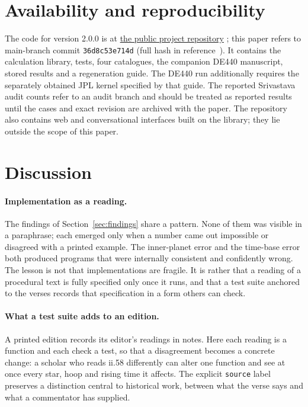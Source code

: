 \documentclass[11pt,a4paper]{article}
\begin{document}
\section{Availability and reproducibility}
\label{sec:availability}

The code for version 2.0.0 is at \href{https://github.com/mrashutoshnigam/surya-siddhanta}{the public project repository} \citep{nigam2026software}; this paper refers to main-branch commit \texttt{36d8c53e714d} (full hash in reference~\citep{nigam2026software}). It contains the calculation library, tests, four catalogues, the companion DE440 manuscript, stored results and a regeneration guide. The DE440 run additionally requires the separately obtained JPL kernel specified by that guide. The reported Srivastava audit counts refer to an audit branch and should be treated as reported results until the cases and exact revision are archived with the paper. The repository also contains web and conversational interfaces built on the library; they lie outside the scope of this paper.

\section{Discussion}
\label{sec:discussion}

\paragraph{Implementation as a reading.} The findings of Section~\ref{sec:findings} share a pattern. None of them was visible in a paraphrase; each emerged only when a number came out impossible or disagreed with a printed example. The inner-planet error and the time-base error both produced programs that were internally consistent and confidently wrong. The lesson is not that implementations are fragile. It is rather that a reading of a procedural text is fully specified only once it runs, and that a test suite anchored to the verses records that specification in a form others can check.

\paragraph{What a test suite adds to an edition.} A printed edition records its editor's readings in notes. Here each reading is a function and each check a test, so that a disagreement becomes a concrete change: a scholar who reads ii.58 differently can alter one function and see at once every star, hoop and rising time it affects. The explicit \texttt{source} label preserves a distinction central to historical work, between what the verse says and what a commentator has supplied.
\end{document}
